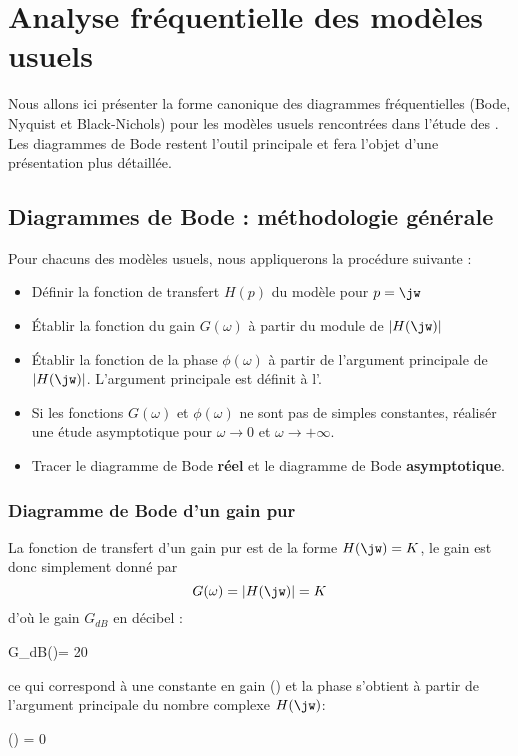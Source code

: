 \newpage
\section{Analyse fréquentielle des modèles usuels}

Nous allons ici présenter la forme canonique des diagrammes fréquentielles (Bode, Nyquist et Black-Nichols) pour 
les modèles usuels rencontrées dans l'étude des \SLCI. Les diagrammes de Bode restent l'outil principale et fera 
l'objet d'une présentation plus détaillée.

\subsection{Diagrammes de Bode : méthodologie générale}
Pour chacuns des modèles usuels, nous appliquerons la procédure suivante :
\begin{itemize}
    \item Définir la fonction de transfert $H(p)$ du modèle pour $p=\jw$
    \item \'Etablir la fonction du gain $G(\omega)$ à partir du module de $|H(\jw)|$
    \item \'Etablir la fonction de la phase $\phi(\omega)$ à partir de l'argument principale de $|H(\jw)|$.
          L'argument principale est définit à l'.
    \item Si les fonctions $G(\omega)$ et $\phi(\omega)$ ne sont pas de simples constantes, réalisér une étude
        asymptotique pour $\omega\rightarrow 0$ et $\omega\rightarrow +\infty$.
    \item Tracer le diagramme de Bode \textbf{réel} et le diagramme de Bode \textbf{asymptotique}.
\end{itemize}

\newpage
\subsubsection{Diagramme de Bode d'un gain pur}
La fonction de transfert d'un gain pur est de la forme $H(\jw)=K$,
le gain est donc simplement donné par 
$$
G(\omega)=|H(\jw)|=K
$$ 
d'où le gain $G_{dB}$ en décibel :
\begin{bequation}
G_{dB}(\omega)= 20
\end{bequation} ce qui correspond à une constante en gain () 
et la phase s'obtient à partir de l'argument principale du nombre complexe $H(\jw)$:
\begin{bequation}
\phi(\omega) = 0
\end{bequation}


